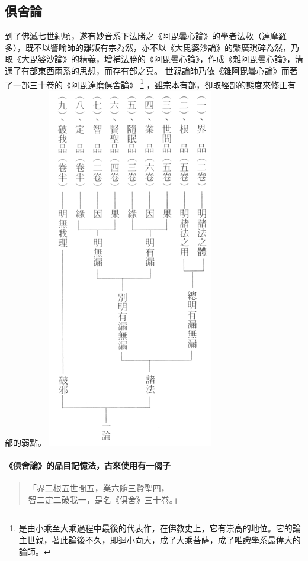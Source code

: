 \subsection{俱舍論}
到了佛滅七世紀頃，遂有妙音系下法勝之《阿毘曇心論》的學者法救（達摩羅多），既不以譬喻師的離叛有宗為然，亦不以《大毘婆沙論》的繁廣瑣碎為然，乃取《大毘婆沙論》的精義，增補法勝的《阿毘曇心論》，作成《雜阿毘曇心論》，溝通了有部東西兩系的思想，而存有部之真。
世親論師乃依《雜阿毘曇心論》而著了一部三十卷的《阿毘達磨俱舍論》
\footnote{是由小乘至大乘過程中最後的代表作，在佛教史上，它有崇高的地位。它的論主世親，著此論後不久，即迴小向大，成了大乘菩薩，成了唯識學系最偉大的論師。}
，雖宗本有部，卻取經部的態度來修正有部的弱點。
\includegraphics[scale=0.5]{释家/images/俱舍论科判.png}
\paragraph{《俱舍論》的品目記憶法，古來使用有一偈子}
\begin{quote}
「界二根五世間五，業六隨三賢聖四，\\
智二定二破我一，是名《俱舍》三十卷。」
\end{quote}
